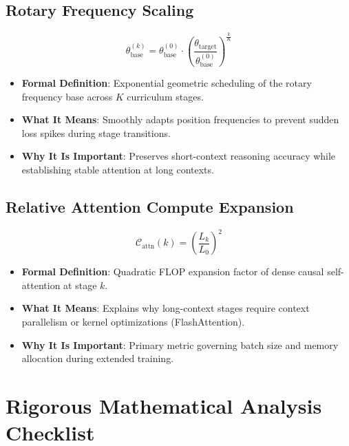 \documentclass[11pt,a4paper]{article}
\theoremstyle{definition}
\begin{document}
\subsection{Rotary Frequency Scaling}
{\boldmath
\begin{equation}
\theta_{\text{base}}^{(k)} = \theta_{\text{base}}^{(0)} \cdot \left( \frac{\theta_{\text{target}}}{\theta_{\text{base}}^{(0)}} \right)^{\frac{k}{K}}
\end{equation}
}
\begin{itemize}
    \item \textbf{Formal Definition}: Exponential geometric scheduling of the rotary frequency base across $K$ curriculum stages.
    \item \textbf{What It Means}: Smoothly adapts position frequencies to prevent sudden loss spikes during stage transitions.
    \item \textbf{Why It Is Important}: Preserves short-context reasoning accuracy while establishing stable attention at long contexts.
\end{itemize}

\subsection{Relative Attention Compute Expansion}
{\boldmath
\begin{equation}
\mathcal{C}_{\text{attn}}(k) = \left( \frac{L_k}{L_0} \right)^2
\end{equation}
}
\begin{itemize}
    \item \textbf{Formal Definition}: Quadratic FLOP expansion factor of dense causal self-attention at stage $k$.
    \item \textbf{What It Means}: Explains why long-context stages require context parallelism or kernel optimizations (FlashAttention).
    \item \textbf{Why It Is Important}: Primary metric governing batch size and memory allocation during extended training.
\end{itemize}

\section{Rigorous Mathematical Analysis Checklist}
\end{document}
